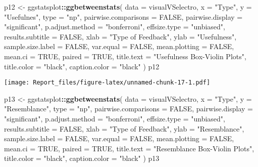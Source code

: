 \documentclass[
]{article}
\newenvironment{Shaded}{\begin{snugshade}}{\end{snugshade}}
\newcommand{\DataTypeTok}[1]{\textcolor[rgb]{0.13,0.29,0.53}{#1}}
\newcommand{\KeywordTok}[1]{\textcolor[rgb]{0.13,0.29,0.53}{\textbf{#1}}}
\newcommand{\NormalTok}[1]{#1}
\newcommand{\OperatorTok}[1]{\textcolor[rgb]{0.81,0.36,0.00}{\textbf{#1}}}
\newcommand{\OtherTok}[1]{\textcolor[rgb]{0.56,0.35,0.01}{#1}}
\newcommand{\StringTok}[1]{\textcolor[rgb]{0.31,0.60,0.02}{#1}}
\begin{document}
\begin{Shaded}
\begin{Highlighting}[]
\NormalTok{p12 <-}\StringTok{ }\NormalTok{ggstatsplot}\OperatorTok{::}\KeywordTok{ggbetweenstats}\NormalTok{(}
  \DataTypeTok{data =}\NormalTok{ visualVSelectro,}
  \DataTypeTok{x =} \StringTok{"Type"}\NormalTok{,}
  \DataTypeTok{y =} \StringTok{"Usefulnes"}\NormalTok{,}
  \DataTypeTok{type =} \StringTok{"np"}\NormalTok{,}
  \DataTypeTok{pairwise.comparisons =} \OtherTok{FALSE}\NormalTok{,}
  \DataTypeTok{pairwise.display =} \StringTok{"significant"}\NormalTok{,}
  \DataTypeTok{p.adjust.method =} \StringTok{"bonferroni"}\NormalTok{,}
  \DataTypeTok{effsize.type =} \StringTok{"unbiased"}\NormalTok{,}
  \DataTypeTok{results.subtitle =} \OtherTok{FALSE}\NormalTok{,}
  \DataTypeTok{xlab =} \StringTok{"Type of Feedback"}\NormalTok{,}
  \DataTypeTok{ylab =} \StringTok{"Usefulness"}\NormalTok{,}
  \DataTypeTok{sample.size.label =} \OtherTok{FALSE}\NormalTok{,}
  \DataTypeTok{var.equal =} \OtherTok{FALSE}\NormalTok{,}
  \DataTypeTok{mean.plotting =} \OtherTok{FALSE}\NormalTok{,}
  \DataTypeTok{mean.ci =} \OtherTok{TRUE}\NormalTok{,}
  \DataTypeTok{paired =} \OtherTok{TRUE}\NormalTok{,}
  \DataTypeTok{title.text =} \StringTok{"Usefulness Box-Violin Plots"}\NormalTok{,}
  \DataTypeTok{title.color =} \StringTok{"black"}\NormalTok{,}
  \DataTypeTok{caption.color =} \StringTok{"black"}
\NormalTok{  )}
\NormalTok{p12}
\end{Highlighting}
\end{Shaded}

\texttt{[image: Report\_files/figure-latex/unnamed-chunk-17-1.pdf]}

\begin{Shaded}
\begin{Highlighting}[]
\NormalTok{p13 <-}\StringTok{ }\NormalTok{ggstatsplot}\OperatorTok{::}\KeywordTok{ggbetweenstats}\NormalTok{(}
  \DataTypeTok{data =}\NormalTok{ visualVSelectro,}
  \DataTypeTok{x =} \StringTok{"Type"}\NormalTok{,}
  \DataTypeTok{y =} \StringTok{"Resemblance"}\NormalTok{,}
  \DataTypeTok{type =} \StringTok{"np"}\NormalTok{,}
  \DataTypeTok{pairwise.comparisons =} \OtherTok{FALSE}\NormalTok{,}
  \DataTypeTok{pairwise.display =} \StringTok{"significant"}\NormalTok{,}
  \DataTypeTok{p.adjust.method =} \StringTok{"bonferroni"}\NormalTok{,}
  \DataTypeTok{effsize.type =} \StringTok{"unbiased"}\NormalTok{,}
  \DataTypeTok{results.subtitle =} \OtherTok{FALSE}\NormalTok{,}
  \DataTypeTok{xlab =} \StringTok{"Type of Feedback"}\NormalTok{,}
  \DataTypeTok{ylab =} \StringTok{"Resemblance"}\NormalTok{,}
  \DataTypeTok{sample.size.label =} \OtherTok{FALSE}\NormalTok{,}
  \DataTypeTok{var.equal =} \OtherTok{FALSE}\NormalTok{,}
  \DataTypeTok{mean.plotting =} \OtherTok{FALSE}\NormalTok{,}
  \DataTypeTok{mean.ci =} \OtherTok{TRUE}\NormalTok{,}
  \DataTypeTok{paired =} \OtherTok{TRUE}\NormalTok{,}
  \DataTypeTok{title.text =} \StringTok{"Resemblance Box-Violin Plots"}\NormalTok{,}
  \DataTypeTok{title.color =} \StringTok{"black"}\NormalTok{,}
  \DataTypeTok{caption.color =} \StringTok{"black"}
\NormalTok{  )}
\NormalTok{p13}
\end{Highlighting}
\end{Shaded}
\end{document}
